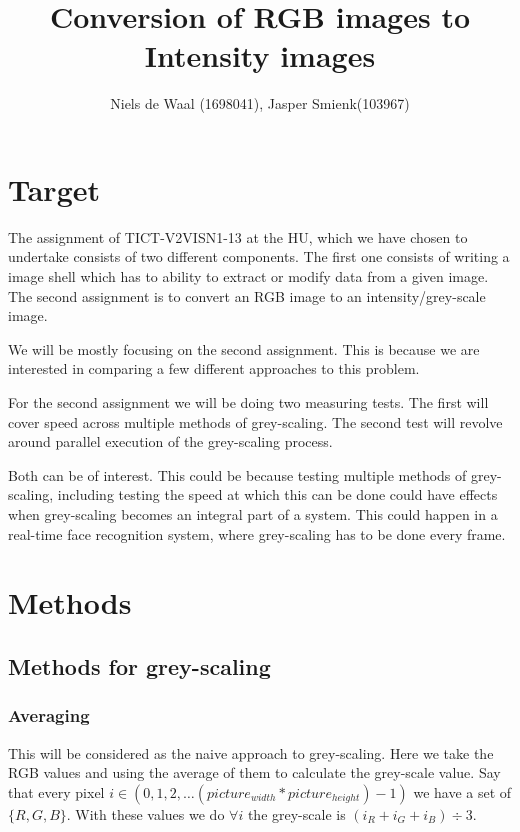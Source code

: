 \documentclass[a4paper]{article}
\begin{document}
\title{Conversion of RGB images to Intensity images}
\author{Niels de Waal (1698041), Jasper Smienk(103967)}
\maketitle
\newpage

\tableofcontents
\newpage

\section{Target}
The assignment of TICT-V2VISN1-13 at the HU, which we have chosen to undertake consists of two different components.
The first one consists of writing a image shell which has to ability to extract or modify data from a given image.
The second assignment is to convert an RGB image to an intensity/grey-scale image. 

We will be mostly focusing on the second assignment. This is because we are interested in comparing a few different approaches to this problem.

For the second assignment we will be doing two measuring tests. The first will cover speed across multiple methods of grey-scaling. The second test will revolve around parallel execution of the grey-scaling process.

Both can be of interest. This could be because testing multiple methods of grey-scaling, including testing the speed at which this can be done could have effects when grey-scaling becomes an integral part of a system. This could happen in a real-time face recognition system, where grey-scaling has to be done every frame.

\section{Methods}


\subsection{Methods for grey-scaling}
\subsubsection{Averaging}
This will be considered as the naive approach to grey-scaling. Here we take the RGB values and using the average of them to calculate the grey-scale value. 
Say that every pixel \(i \in \left( 0, 1, 2, \dotsc \left( picture_{width} * picture_{height} \right) - 1 \right) \) we have a set of \(\{ R, G, B\}\).
With these values we do \( \forall i \) the grey-scale is \( \left( i_{R} + i_{G} + i_{B} \right) \div 3 \).
\end{document}
